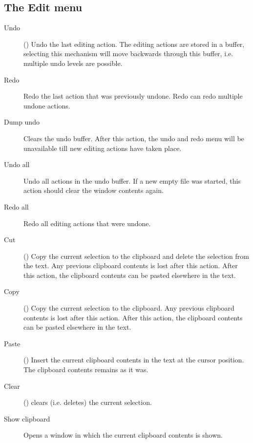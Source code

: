 \subsection{The Edit menu}
\label{se:menuedit}
\begin{description}
\item[Undo] ()
Undo the last editing action. The editing actions are stored in a buffer,
selecting this mechanism will move backwards through this buffer, i.e.
multiple undo levels are possible.
\item[Redo] Redo the last action that was previously undone. Redo can redo
multiple undone actions. 
\item[Dump undo]
Clears the undo buffer. After this action, the undo and redo menu will be 
unavailable till new editing actions have taken place.
\item[Undo all]
Undo all actions in the undo buffer. If a new empty file was started, this
action should clear the window contents again.
\item[Redo all]
Redo all editing actions that were undone.
\item[Cut] () Copy the current selection to the clipboard
and delete the selection from the text. Any previous clipboard contents is
lost after this action. After this action, the clipboard contents can be 
pasted elsewhere in the text.
\item[Copy] () Copy the current selection to the clipboard.
Any previous clipboard contents is lost after this action. 
After this action, the clipboard contents can be pasted elsewhere in the text.
\item[Paste] () Insert the current clipboard contents in
the text at the cursor position. The clipboard contents remains as it was.
\item[Clear] () clears (i.e. deletes) the current
selection.
\item[Show clipboard] Opens a window in which the current clipboard contents
is shown.
\end{description}
%
%
